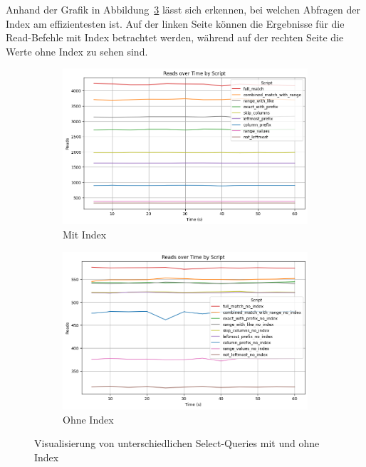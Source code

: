 Anhand der Grafik in Abbildung~\ref{fig:indexing-b-tree-query-reads} lässt sich erkennen, bei welchen Abfragen der Index am effizientesten ist.
Auf der linken Seite können die Ergebnisse für die Read-Befehle mit Index betrachtet werden, während auf der rechten Seite die Werte ohne Index zu sehen sind.

\vspace{-5pt}
\begin{figure}[H]
    \centering
    \begin{subfigure}[t]{0.48\textwidth}
        \centering
        \includegraphics[width=\textwidth]{PNGs/Script/Index/B_Tree/b-tree-query-differences/Reads}
        \caption{Mit Index}
        \label{indexing-b-tree-query-reads-index}
    \end{subfigure}
    \hfill
    \begin{subfigure}[t]{0.48\textwidth}
        \centering
        \includegraphics[width=\textwidth]{PNGs/Script/Index/B_Tree/b-tree-query-differences-no-index/Reads}
        \caption{Ohne Index}
        \label{indexing-b-tree-query-reads-no-index}
    \end{subfigure}
    \vspace{-5pt}
    \caption[B-Tree-Indexing: Unterschiedliche Selects mit Index und Ohne]{Visualisierung von unterschiedlichen Select-Queries mit und ohne Index}
    \label{fig:indexing-b-tree-query-reads}
\end{figure}
\vspace{-15pt}

